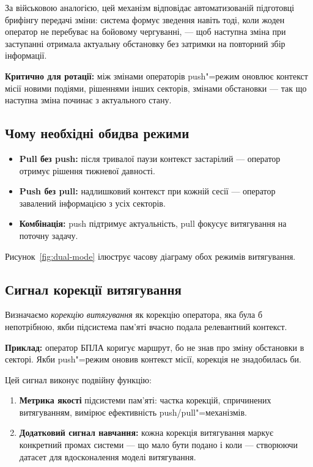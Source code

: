 \documentclass[11pt]{article}
\begin{document}
За військовою аналогією, цей механізм відповідає автоматизованій підготовці брифінгу передачі зміни: система формує зведення навіть тоді, коли жоден оператор не перебуває на бойовому чергуванні, --- щоб наступна зміна при заступанні отримала актуальну обстановку без затримки на повторний збір інформації.

\textbf{Критично для ротації:} між змінами операторів push"=режим оновлює контекст місії новими подіями, рішеннями інших секторів, змінами обстановки --- так що наступна зміна починає з актуального стану.

\subsection{Чому необхідні обидва режими}

\begin{itemize}[nosep]
  \item \textbf{Pull без push:} після тривалої паузи контекст застарілий --- оператор отримує рішення тижневої давності.
  \item \textbf{Push без pull:} надлишковий контекст при кожній сесії --- оператор завалений інформацією з усіх секторів.
  \item \textbf{Комбінація:} push підтримує актуальність, pull фокусує витягування на поточну задачу.
\end{itemize}

Рисунок~\ref{fig:dual-mode} ілюструє часову діаграму обох режимів витягування.



\subsection{Сигнал корекції витягування}
\label{sec:retrieval-correction}

Визначаємо \emph{корекцію витягування} як корекцію оператора, яка була б непотрібною, якби підсистема пам'яті вчасно подала релевантний контекст.

\textbf{Приклад:} оператор БПЛА коригує маршрут, бо не знав про зміну обстановки в секторі.
Якби push"=режим оновив контекст місії, корекція не знадобилась би.

Цей сигнал виконує подвійну функцію:
\begin{enumerate}[nosep]
  \item \textbf{Метрика якості} підсистеми пам'яті: частка корекцій, спричинених витягуванням, вимірює ефективність push/pull"=механізмів.
  \item \textbf{Додатковий сигнал навчання:} кожна корекція витягування маркує конкретний промах системи --- що мало бути подано і коли --- створюючи датасет для вдосконалення моделі витягування.
\end{enumerate}
\end{document}

